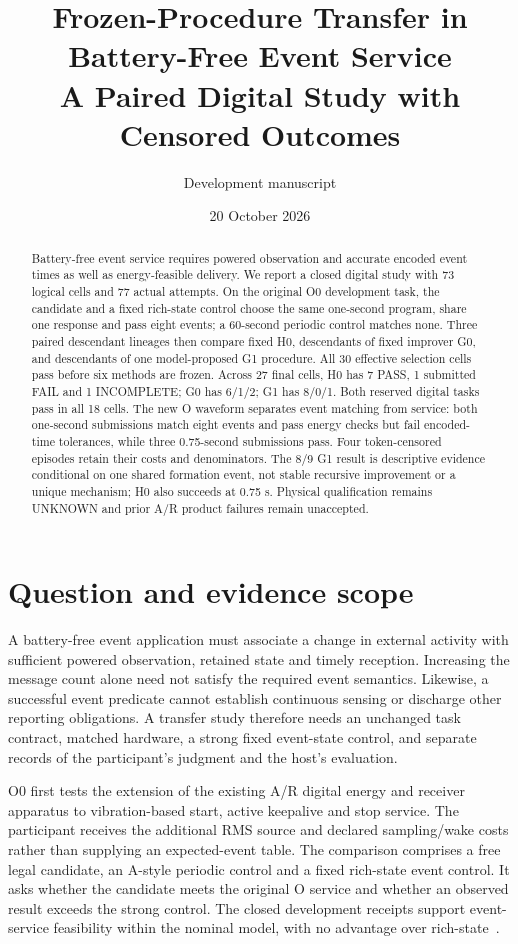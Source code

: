 \documentclass[10pt]{article}
\title{Frozen-Procedure Transfer in Battery-Free Event Service\\A Paired Digital Study with Censored Outcomes}
\author{Development manuscript}
\date{20 October 2026}
\begin{document}
\maketitle
\begin{abstract}
Battery-free event service requires powered observation and accurate encoded
event times as well as energy-feasible delivery. We report a closed digital
study with 73 logical cells and 77 actual attempts. On the original O0 development
task, the candidate and a fixed rich-state control choose the same one-second
program, share one response and pass eight events; a 60-second periodic control
matches none. Three paired descendant lineages then compare fixed H0, descendants
of fixed improver G0, and descendants of one model-proposed G1 procedure.
All 30 effective selection cells pass before six methods are frozen. Across
27 final cells, H0 has 7 PASS, 1 submitted FAIL and 1 INCOMPLETE; G0 has 6/1/2;
G1 has 8/0/1. Both reserved digital tasks pass in all 18 cells. The new O waveform
separates event matching from service: both one-second submissions match eight
events and pass energy checks but fail encoded-time tolerances, while three
0.75-second submissions pass. Four token-censored episodes retain their costs
and denominators. The 8/9 G1 result is descriptive evidence conditional on one
shared formation event, not stable recursive improvement or a unique mechanism;
H0 also succeeds at 0.75 s. Physical qualification remains UNKNOWN and prior
A/R product failures remain unaccepted.
\end{abstract}

\section{Question and evidence scope}
A battery-free event application must associate a change in external activity
with sufficient powered observation, retained state and timely reception.
Increasing the message count alone need not satisfy the required event semantics.
Likewise, a successful event predicate cannot establish continuous sensing or
discharge other reporting obligations. A transfer study therefore needs an
unchanged task contract, matched hardware, a strong fixed event-state control,
and separate records of the participant's judgment and the host's evaluation.

O0 first tests the extension of the existing A/R digital energy and receiver apparatus
to vibration-based start, active keepalive and stop service. The participant
receives the additional RMS source and declared sampling/wake costs rather
than supplying an expected-event table. The comparison comprises a free legal
candidate, an A-style periodic control and a fixed rich-state event control.
It asks whether the candidate meets the original O service and whether an
observed result exceeds the strong control. The closed development receipts
support event-service feasibility within the nominal model, with no advantage
over rich-state~\cite{o0,first}.
\end{document}
